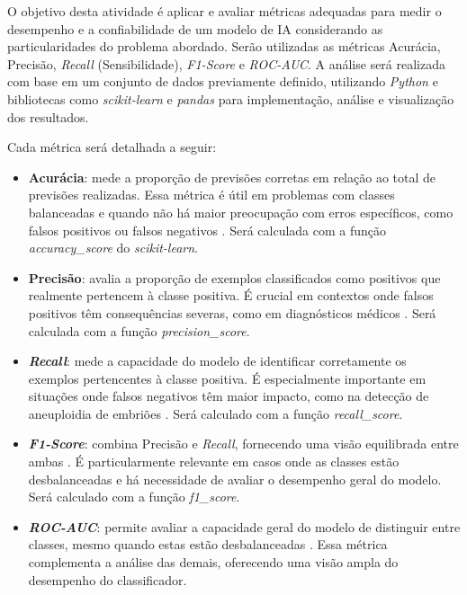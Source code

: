 O objetivo desta atividade é aplicar e avaliar métricas adequadas para medir o desempenho e a confiabilidade de um modelo de IA considerando as particularidades do problema abordado. Serão utilizadas as métricas Acurácia, Precisão, \textit{Recall} (Sensibilidade), \textit{F1-Score} e \textit{ROC-AUC}. A análise será realizada com base em um conjunto de dados previamente definido, utilizando \textit{Python} e bibliotecas como \textit{scikit-learn} e \textit{pandas} para implementação, análise e visualização dos resultados.

Cada métrica será detalhada a seguir:

\begin{itemize}
    \item \textbf{Acurácia}: mede a proporção de previsões corretas em relação ao total de previsões realizadas. Essa métrica é útil em problemas com classes balanceadas e quando não há maior preocupação com erros específicos, como falsos positivos ou falsos negativos \cite{vilela2022}. Será calculada com a função \textit{accuracy\_score} do \textit{scikit-learn}.
    
    \item \textbf{Precisão}: avalia a proporção de exemplos classificados como positivos que realmente pertencem à classe positiva. É crucial em contextos onde falsos positivos têm consequências severas, como em diagnósticos médicos \cite{vilela2022}. Será calculada com a função \textit{precision\_score}.
    
    \item \textbf{\textit{Recall}}: mede a capacidade do modelo de identificar corretamente os exemplos pertencentes à classe positiva. É especialmente importante em situações onde falsos negativos têm maior impacto, como na detecção de aneuploidia de embriões \cite{vilela2022}. Será calculado com a função \textit{recall\_score}.
    
    \item \textbf{\textit{F1-Score}}: combina Precisão e \textit{Recall}, fornecendo uma visão equilibrada entre ambas \cite{vilela2022}. É particularmente relevante em casos onde as classes estão desbalanceadas e há necessidade de avaliar o desempenho geral do modelo. Será calculado com a função \textit{f1\_score}.
    
    \item \textbf{\textit{ROC-AUC}}: permite avaliar a capacidade geral do modelo de distinguir entre classes, mesmo quando estas estão desbalanceadas \cite{vilela2022}. Essa métrica complementa a análise das demais, oferecendo uma visão ampla do desempenho do classificador.
\end{itemize}

